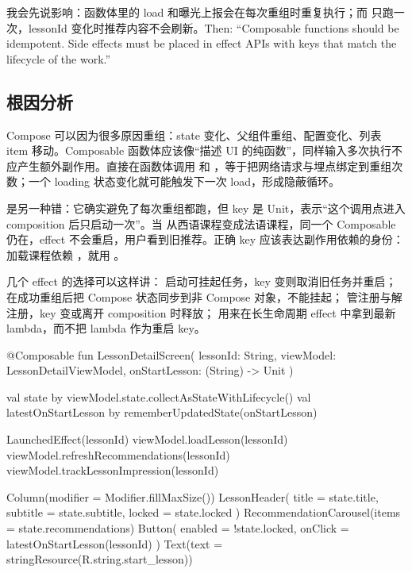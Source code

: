 \begin{sayit}[面试里怎么说]
我会先说影响：函数体里的 load 和曝光上报会在每次重组时重复执行；而  只跑一次，lessonId 变化时推荐内容不会刷新。Then: ``Composable functions should be idempotent. Side effects must be placed in effect APIs with keys that match the lifecycle of the work.''
\end{sayit}

\subsection*{根因分析}
Compose 可以因为很多原因重组：state 变化、父组件重组、配置变化、列表 item 移动。Composable 函数体应该像“描述 UI 的纯函数”，同样输入多次执行不应产生额外副作用。直接在函数体调用  和 ，等于把网络请求与埋点绑定到重组次数；一个 loading 状态变化就可能触发下一次 load，形成隐蔽循环。

 是另一种错：它确实避免了每次重组都跑，但 key 是 Unit，表示“这个调用点进入 composition 后只启动一次”。当  从西语课程变成法语课程，同一个 Composable 仍在，effect 不会重启，用户看到旧推荐。正确 key 应该表达副作用依赖的身份：加载课程依赖 ，就用 。

几个 effect 的选择可以这样讲： 启动可挂起任务，key 变则取消旧任务并重启； 在成功重组后把 Compose 状态同步到非 Compose 对象，不能挂起； 管注册与解注册，key 变或离开 composition 时释放； 用来在长生命周期 effect 中拿到最新 lambda，而不把 lambda 作为重启 key。

\begin{ktfix}
@Composable
fun LessonDetailScreen(
    lessonId: String,
    viewModel: LessonDetailViewModel,
    onStartLesson: (String) -> Unit
) {
    val state by viewModel.state.collectAsStateWithLifecycle()
    val latestOnStartLesson by rememberUpdatedState(onStartLesson)

    LaunchedEffect(lessonId) {
        viewModel.loadLesson(lessonId)
        viewModel.refreshRecommendations(lessonId)
        viewModel.trackLessonImpression(lessonId)
    }

    Column(modifier = Modifier.fillMaxSize()) {
        LessonHeader(
            title = state.title,
            subtitle = state.subtitle,
            locked = state.locked
        )
        RecommendationCarousel(items = state.recommendations)
        Button(
            enabled = !state.locked,
            onClick = { latestOnStartLesson(lessonId) }
        ) {
            Text(text = stringResource(R.string.start_lesson))
        }
    }
}
\end{ktfix}

